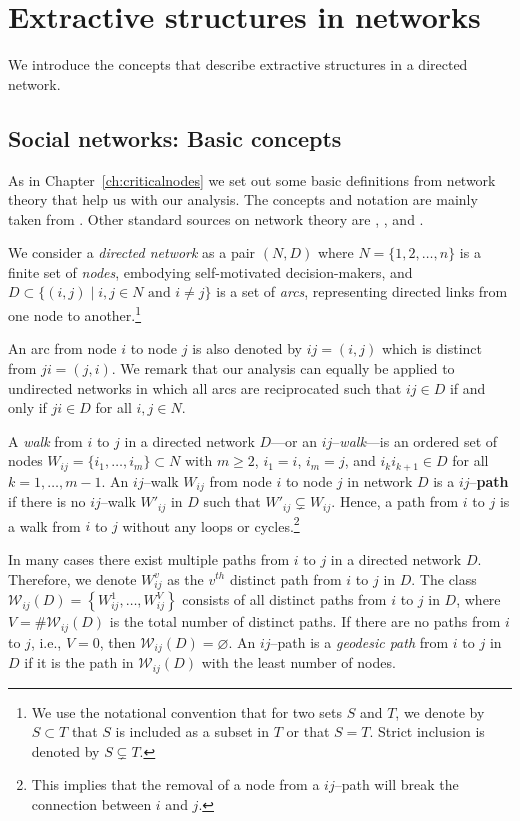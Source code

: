 \section{Extractive structures in networks}

We introduce the concepts that describe extractive structures in a directed network.

\subsection{Social networks: Basic concepts}

As in Chapter~\ref{ch:criticalnodes} we set out some basic definitions from network theory that help us with our analysis. The concepts and notation are mainly taken from \citet{Jackson2008}. Other standard sources on network theory are \citet{Newman2006book}, \citet{Goyal2007}, \citet{Newman2010} and \citet{Gilles2010}.

We consider a \emph{directed network} as a pair $(N,D)$ where $N=\{1 , 2 , \ldots , n\}$ is a finite set of \emph{nodes}, embodying self-motivated decision-makers, and $D \subset \{(i,j) \mid i,j \in N \mbox{ and } i \neq j\}$ is a set of \emph{arcs}, representing directed links from one node to another.\footnote{We use the notational convention that for two sets $S$ and $T$, we denote by $S \subset T$ that $S$ is included as a subset in $T$ or that $S=T$. Strict inclusion is denoted by $S \subsetneq T$.}

An arc from node $i$ to node $j$ is also denoted by $ij = (i,j)$ which is distinct from $ji = (j,i)$. We remark that our analysis can equally be applied to undirected networks in which all arcs are reciprocated such that $ij \in D$ if and only if $ji \in D$ for all $i,j \in N$.

A \textit{walk} from $i$ to $j$ in a directed network $D$---or an $ij$--\textit{walk}---is an ordered set of nodes $W_{ij} = \{ i_{1}, \ldots ,i_{m} \} \subset N$ with $m \geq 2$, $i_1 =i$, $i_m =j$, and $i_{k}i_{k+1} \in D$ for all $k=1, \ldots ,m-1$. An $ij$--walk $W_{ij}$ from node $i$ to node $j$ in network $D$ is a $ij$--\textbf{path} if there is no $ij$--walk $W'_{ij}$ in $D$ such that $W'_{ij} \subsetneq W_{ij}$. Hence, a path from $i$ to $j$ is a walk from $i$ to $j$ without any loops or cycles.\footnote{This implies that the removal of a node from a $ij$--path will break the connection between $i$ and $j$.}

In many cases there exist multiple paths from $i$ to $j$ in a directed network $D$. Therefore, we denote $W_{ij}^{v}$ as the $v^{th}$ distinct path from $i$ to $j$ in $D$. The class $\mathcal{W}_{ij} (D) = \left\{ W_{ij}^{1}, \ldots ,W_{ij}^{V} \right\}$ consists of all distinct paths from $i$ to $j$ in $D$, where $V = \# \mathcal{W}_{ij}(D)$ is the total number of distinct paths.  If there are no paths from $i$ to $j$, i.e., $V=0$, then $\mathcal{W}_{ij}(D)= \varnothing$. An $ij$--path is a \emph{geodesic path} from $i$ to $j$ in $D$ if it is the path in $\mathcal{W}_{ij} (D)$ with the least number of nodes.

